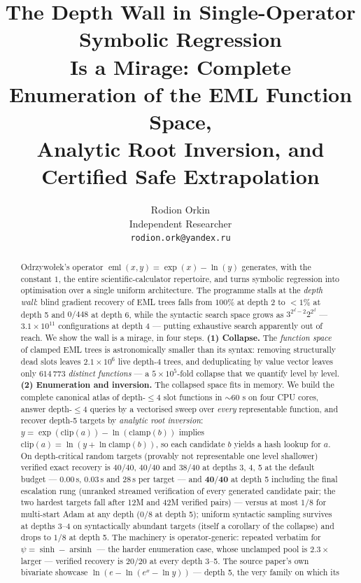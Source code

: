 \documentclass[11pt]{article}
\title{The Depth Wall in Single-Operator Symbolic Regression\\
       Is a Mirage: Complete Enumeration of the EML Function Space,\\
       Analytic Root Inversion, and Certified Safe Extrapolation}
\author{Rodion Orkin\\ Independent Researcher\\ \texttt{rodion.ork@yandex.ru}}
\date{}
\newcommand{\eml}{\operatorname{eml}}
\begin{document}
\maketitle

\begin{abstract}
Odrzywo{\l}ek's operator $\eml(x,y)=\exp(x)-\ln(y)$ generates, with the
constant $1$, the entire scientific-calculator repertoire, and turns
symbolic regression into optimisation over a single uniform
architecture. The programme stalls at the \emph{depth wall}: blind
gradient recovery of EML trees falls from $100\%$ at depth 2 to
${<}1\%$ at depth 5 and $0/448$ at depth 6, while the syntactic search
space grows as $3^{2^d-2}2^{2^d}$ — $3.1\times10^{11}$ configurations
at depth 4 — putting exhaustive search apparently out of reach. We show
the wall is a mirage, in four steps. \textbf{(1) Collapse.} The
\emph{function space} of clamped EML trees is astronomically smaller
than its syntax: removing structurally dead slots leaves
$2.1\times10^{6}$ live depth-4 trees, and deduplicating by value
vector leaves only $614\,773$ \emph{distinct functions} — a
$5\times10^{5}$-fold collapse that we quantify level by level.
\textbf{(2) Enumeration and inversion.} The collapsed space fits in
memory. We build the complete canonical atlas of depth-$\le 4$ slot
functions in ${\sim}60$ s on four CPU cores, answer depth-$\le4$
queries by a vectorised sweep over \emph{every} representable
function, and recover depth-5 targets by \emph{analytic root
inversion}: $y=\exp(\mathrm{clip}(a))-\ln(\mathrm{clamp}(b))$ implies
$\mathrm{clip}(a)=\ln(y+\ln \mathrm{clamp}(b))$, so each candidate $b$
yields a hash lookup for $a$. On depth-critical random targets
(provably not representable one level shallower) verified exact
recovery is $40/40$, $40/40$ and $38/40$ at depths 3, 4, 5 at the
default budget — 0.00\,s, 0.03\,s and 28\,s per target — and
$\mathbf{40/40}$ at depth 5 including the final escalation rung
(unranked streamed verification of every generated candidate pair; the
two hardest targets fall after 12M and 42M verified pairs) — versus at
most $1/8$ for
multi-start Adam at any depth ($0/8$ at depth 5); uniform syntactic
sampling survives at depths 3--4 on syntactically abundant targets
(itself a corollary of the collapse) and drops to $1/8$ at depth 5.
The machinery is operator-generic: repeated verbatim for
$\psi=\sinh-\operatorname{arsinh}$ — the harder enumeration case,
whose unclamped pool is $2.3\times$ larger — verified recovery is
$20/20$ at every depth 3--5.
The source paper's own bivariate showcase
$\ln(e-\ln(e^x-\ln y))$ — depth 5, the very family on which its

\end{abstract}
\end{document}
